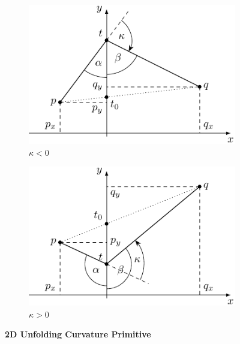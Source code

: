 \documentclass{stdlocal}
\begin{document}
  \begin{figure}[h]
    \centering
    \begin{subfigure}[b]{0.49\linewidth}
      \centering
      \includegraphics[width=\linewidth]{figures/unfolding_curvature_2d.pdf}
      \caption{$κ < 0$}
    \end{subfigure}
    \hfill
    \begin{subfigure}[b]{0.49\linewidth}
      \centering
      \includegraphics[width=\linewidth]{figures/unfolding_curvature_2d_positive.pdf}
      \caption{$κ > 0$}
    \end{subfigure}
    \caption[2D Unfolding Curvature Primitive]{%
      \textbf{2D Unfolding Curvature Primitive}\\
    }
    \label{fig:}
  \end{figure}
\end{document}
